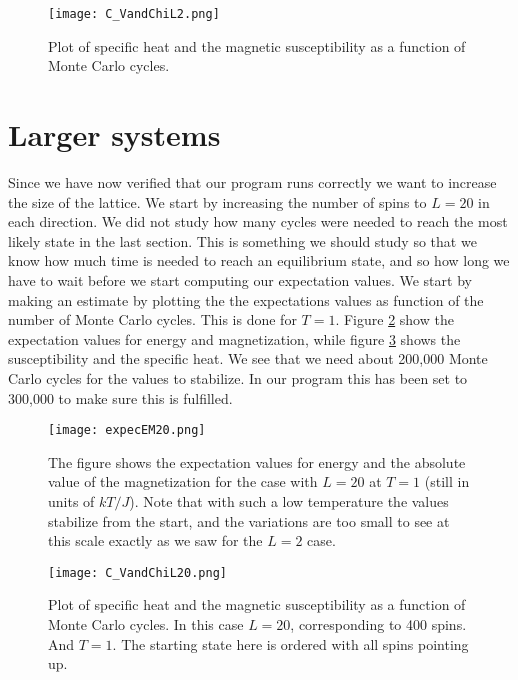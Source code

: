 \documentclass{aa}   %
\begin{document}
\begin{figure}
 \texttt{[image: C\_VandChiL2.png]}
 \caption{Plot of specific heat and the magnetic susceptibility as a function of Monte Carlo cycles.}
\label{C_VandChiL2}
\end{figure}


\section{Larger systems}\label{sec:Monte Carlo import}
Since we have now verified that our program runs correctly we want to increase the size of the lattice. We start by increasing the number of spins to $L = 20$ in each direction.
We did not study how many cycles were needed to reach the most likely state in the last section. This is something we should study so that we know how much time is needed to reach an equilibrium state, and so how long we have to wait before we start computing our expectation values. We start by making an estimate by plotting the the expectations values as function of the number of Monte Carlo cycles. This is done for $T = 1$. Figure \ref{expecEM20} show the expectation values for energy and magnetization, while figure \ref{C_VandChiL20} shows the susceptibility and the specific heat. We see that we need about 200,000 Monte Carlo cycles for the values to stabilize. In our program this has been set to 300,000 to make sure this is fulfilled.

\begin{figure}
 \texttt{[image: expecEM20.png]}
 \caption{The figure shows the expectation values for energy and the absolute value of the magnetization for the case with $L=20$ at $T = 1$ (still in units of $kT/J$). Note that with such a low temperature the values stabilize from the start, and the variations are too small to see at this scale exactly as we saw for the $L=2$ case.}
\label{expecEM20}
\end{figure}


\begin{figure}
 \texttt{[image: C\_VandChiL20.png]}
 \caption{Plot of specific heat and the magnetic susceptibility as a function of Monte Carlo cycles. In this case $L=20$, corresponding to 400 spins. And $T = 1$. The starting state here is ordered with all spins pointing up.}
\label{C_VandChiL20}
\end{figure}
\end{document}
